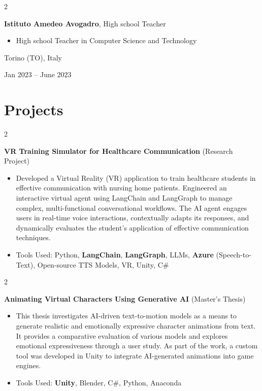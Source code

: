 \documentclass[10pt, letterpaper]{article}
\newenvironment{highlights}{
    \begin{itemize}[
        topsep=0.10 cm,
        parsep=0.10 cm,
        partopsep=0pt,
        itemsep=0pt,
        leftmargin=0.4 cm + 10pt
    ]
}{
    \end{itemize}
} %
\newenvironment{twocolentry}[2][]{
    \onecolentry
    \def\secondColumn{#2}
    \setcolumnwidth{\fill, 4.5 cm}
    \begin{paracol}{2}
}{
    \switchcolumn \raggedleft \secondColumn
    \end{paracol}
    \endonecolentry
} %
\let\hrefWithoutArrow\href
\renewcommand{\href}[2]{\hrefWithoutArrow{#1}{\ifthenelse{\equal{#2}{}}{ }{#2 }\raisebox{.15ex}{\footnotesize \faExternalLink*}}}
\begin{document}
        
   \begin{twocolentry}{
            Torino (TO), Italy

        Jan 2023 – June 2023
        }
            \textbf{Istituto Amedeo Avogadro}, High school Teacher
            \begin{highlights}
                \item High school Teacher in Computer Science and Technology
            \end{highlights}
         \end{twocolentry}
         
    \section{Projects}
        \begin{twocolentry}{}
            \textbf{VR Training Simulator for Healthcare Communication} (Research Project)
            \begin{highlights}
                \item Developed a Virtual Reality (VR) application to train healthcare students in effective communication with nursing home patients. Engineered an interactive virtual agent using LangChain and LangGraph to manage complex, multi-functional conversational workflows. The AI agent engages users in real-time voice interactions, contextually adapts its responses, and dynamically evaluates the student's application of effective communication techniques.
                \item Tools Used: Python, \textbf{LangChain}, \textbf{LangGraph}, LLMs, \textbf{Azure} (Speech-to-Text), Open-source TTS Models, VR, Unity, C\# 
            \end{highlights}
        \end{twocolentry}

        \begin{twocolentry}{
            \href{https://github.com/ciroanni/MasterThesis}{Project Link}
        }
            \textbf{Animating Virtual Characters Using Generative AI} (Master's Thesis)
            \begin{highlights}
                \item This thesis investigates AI-driven text-to-motion models as a means to generate realistic and emotionally expressive character animations from text. It provides a comparative evaluation of various models and explores emotional expressiveness through a user study. As part of the work, a custom tool was developed in Unity to integrate AI-generated animations into game engines.
                \item Tools Used: \textbf{Unity}, Blender, C\#, Python, Anaconda 
            \end{highlights}
        \end{twocolentry}
\end{document}
